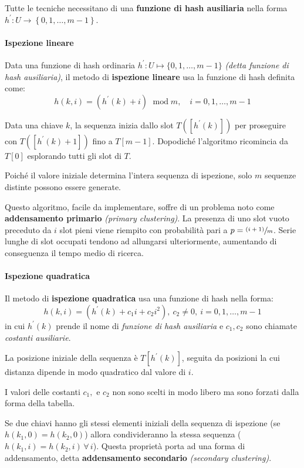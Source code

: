 \documentclass[italian, 10pt]{article}
\DeclareMathOperator{\modop}{\ mod}
\begin{document}
Tutte le tecniche necessitano di una \textbf{funzione di hash ausiliaria} nella forma \(h^\prime : U \rightarrow \left\{0, 1, \ldots, m-1\right\}\).

\paragraph{Ispezione lineare}

Data una funzione di hash ordinaria \(h^\prime : U \mapsto \{0, 1, \ldots, m-1\}\) \textit{(detta funzione di hash ausiliaria)}, il metodo di \textbf{ispezione lineare} usa la funzione di hash definita come:
\[ h(k, i) = (h^\prime(k) + i) \modop m, \quad i = 0, 1, \ldots, m-1 \]

Data una chiave \(k\), la sequenza inizia dallo slot \(T\left([h^\prime (k)]\right)\) per proseguire con \(T\left([h^\prime (k) + 1]\right)\) fino a \(T[m-1]\).
Dopodiché l'algoritmo ricomincia da \(T[0]\) esplorando tutti gli slot di \(T\).

Poiché il valore iniziale determina l'intera sequenza di ispezione, solo \(m\) sequenze distinte possono essere generate.

\bigskip
Questo algoritmo, facile da implementare, soffre di un problema noto come \textbf{addensamento primario} \textit{(primary clustering)}.
La presenza di uno slot vuoto preceduto da \(i\) slot pieni viene riempito con probabilità pari a \(p = \sfrac{(i+1)}{m}\).
Serie lunghe di slot occupati tendono ad allungarsi ulteriormente, aumentando di conseguenza il tempo medio di ricerca.

\paragraph{Ispezione quadratica}

Il metodo di \textbf{ispezione quadratica} usa una funzione di hash nella forma:
\[ h(k, i) = \left(h^\prime(k) + c_1 i + c_2 i ^2\right),\ c_2 \neq 0,\ i = 0, 1, \ldots, m-1 \]
in cui \(h^\prime( k)\) prende il nome di \textit{funzione di hash ausiliaria} e \(c_1, c_2\) sono chiamate \textit{costanti ausiliarie}.

La posizione iniziale della sequenza è \(T\left[h^\prime (k)\right]\), seguita da posizioni la cui distanza dipende in modo quadratico dal valore di \(i\).

I valori delle costanti \(c_1,\) e \(c_2\) non sono scelti in modo libero ma sono forzati dalla forma della tabella.

\bigskip
Se due chiavi hanno gli stessi elementi iniziali della sequenza di ispezione (se \(h(k_1, 0) = h(k_2, 0)\)) allora condivideranno la stessa sequenza (\(h(k_1, i) = h(k_2, i) \, \forall \, i\)).
Questa proprietà porta ad una forma di addensamento, detta \textbf{addensamento secondario} \textit{(secondary clustering)}.
\end{document}

